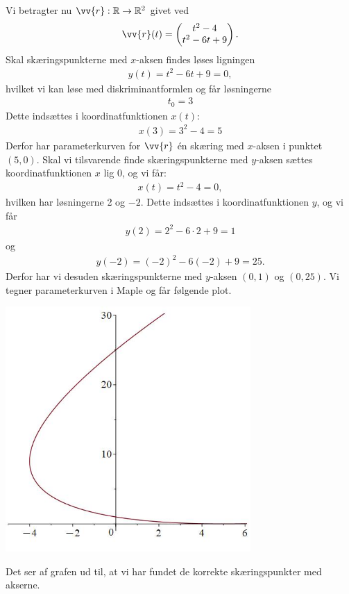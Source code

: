 \begin{exa}
	Vi betragter nu $\vv{r}:\mathbb{R} \to \mathbb{R}^2$ givet ved
	\begin{align*}
		\vv{r}(t) = 
		\begin{pmatrix}
			t^2-4 \\
			t^2-6t+9
		\end{pmatrix}.
	\end{align*}
	Skal skæringspunkterne med $x$-aksen findes løses ligningen
	\begin{align*}
		y(t) = t^2-6t+9 = 0,
	\end{align*}
	hvilket vi kan løse med diskriminantformlen og får løsningerne 
	\begin{align*}
		t_0 = 3
	\end{align*}
	Dette indsættes i koordinatfunktionen $x(t)$:
	\begin{align*}
		x(3) = 3^2-4 = 5
	\end{align*}
	Derfor har parameterkurven for $\vv{r}$ én skæring med $x$-aksen i punktet $(5,0)$.
	Skal vi tilsvarende finde skæringspunkterne med $y$-aksen sættes koordinatfunktionen $x$ lig 0, og vi får:
	\begin{align*}
		x(t) = t^2-4=0,
	\end{align*}
	hvilken har løsningerne 2 og $-2$. 
	Dette indsættes i koordinatfunktionen $y$, og vi får
	\begin{align*}
		y(2) = 2^2-6\cdot 2+9 = 1
	\end{align*}
	og 
	\begin{align*}
		y(-2) = (-2)^2 -6(-2) + 9 = 25.
	\end{align*}
	Derfor har vi desuden skæringspunkterne med $y$-aksen $(0,1)$ og $(0,25)$. Vi tegner parameterkurven i Maple og får følgende plot.
	\begin{center}
		\includegraphics[width=0.7\textwidth]{Billeder/vektor3.jpg}
	\end{center}
	Det ser af grafen ud til, at vi har fundet de korrekte skæringspunkter med akserne.
\end{exa} 
